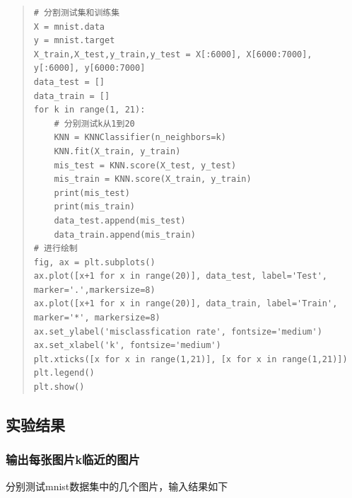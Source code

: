 \documentclass[UTF8]{ctexart}
\begin{document}
\begin{quote}
    \begin{lstlisting}[breaklines, title=计算 misclassification rate]
# 分割测试集和训练集
X = mnist.data
y = mnist.target
X_train,X_test,y_train,y_test = X[:6000], X[6000:7000], y[:6000], y[6000:7000]
data_test = []
data_train = []
for k in range(1, 21):
    # 分别测试k从1到20
    KNN = KNNClassifier(n_neighbors=k)
    KNN.fit(X_train, y_train)
    mis_test = KNN.score(X_test, y_test)
    mis_train = KNN.score(X_train, y_train)
    print(mis_test)
    print(mis_train)
    data_test.append(mis_test)
    data_train.append(mis_train)
# 进行绘制
fig, ax = plt.subplots()
ax.plot([x+1 for x in range(20)], data_test, label='Test', marker='.',markersize=8)
ax.plot([x+1 for x in range(20)], data_train, label='Train', marker='*', markersize=8)
ax.set_ylabel('misclassfication rate', fontsize='medium')
ax.set_xlabel('k', fontsize='medium')
plt.xticks([x for x in range(1,21)], [x for x in range(1,21)])
plt.legend()
plt.show()
    \end{lstlisting}
\end{quote}



\newpage
\subsection{实验结果}
\subsubsection{输出每张图片k临近的图片}
分别测试mnist数据集中的几个图片，输入结果如下
\end{document}
